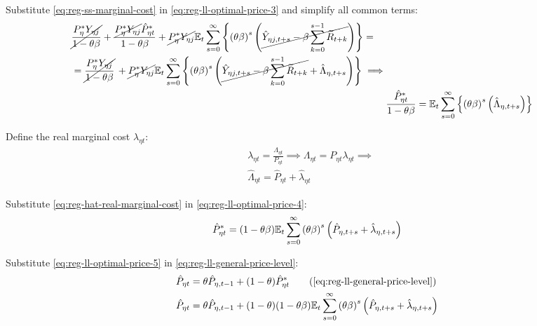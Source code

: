 \documentclass[../thesis.tex]{subfiles}
\begin{document}
Substitute \ref{eq:reg-ss-marginal-cost} in \ref{eq:reg-ll-optimal-price-3} and simplify all common terms:
\begin{align}
	\begin{split}
		& \cancel{\frac{P_{\eta}^{\ast} Y_{\eta j}}{1-\theta\beta}} + \frac{ \cancel{P_{\eta}^{\ast} Y_{\eta j}} \hat{P}_{\eta t}^{\ast}}{1- \theta \beta} + \cancel{P_{\eta}^{\ast} Y_{\eta j}} {\mathbb{E}_{t}} \sum_{s=0}^{\infty} \left\{ \left( \theta \beta \right)^s \left( \cancel{\hat{Y}_{\eta j, t+s} - \beta \sum_{k=0}^{s-1} \widetilde{R}_{t+k}} \right) \right\} = 
		\\
		& = \cancel{\frac{P_{\eta}^{\ast} Y_{\eta j}}{1-\theta\beta}} \, + \cancel{P_{\eta}^{\ast} Y_{\eta j}} {\mathbb{E}_{t}} \sum_{s=0}^{\infty} \left\{ \left( \theta \beta \right)^s \left( \cancel{\hat{Y}_{\eta j, t+s} - \beta \sum_{k=0}^{s-1} \widetilde{R}_{t+k}} + \hat{\Lambda}_{\eta, t+s} \right) \right\} \implies	
	\end{split} \nonumber \\
	& \frac{ \hat{P}_{\eta t}^{\ast}}{1- \theta \beta} = {\mathbb{E}_{t}} \sum_{s=0}^{\infty} \left\{ \left( \theta \beta \right)^s \left( \hat{\Lambda}_{\eta, t+s} \right) \right\} \label{eq:reg-ll-optimal-price-4}
\end{align}



Define the real marginal cost $\lambda_{\eta t}$:
\begin{align}
	& \lambda_{\eta t} = \frac{\Lambda_{\eta t}}{P_{\eta t}} \implies \Lambda_{\eta t} = P_{\eta t} \lambda_{\eta t} \implies \nonumber \\
	& \hat{\Lambda}_{\eta t} = \hat{P}_{\eta t} + \hat{\lambda}_{\eta t} \label{eq:reg-hat-real-marginal-cost}
\end{align}

Substitute \ref{eq:reg-hat-real-marginal-cost} in \ref{eq:reg-ll-optimal-price-4}:
\begin{align}
	\hat{P}_{\eta t}^{\ast} = (1- \theta \beta) {\mathbb{E}_{t}} \sum_{s=0}^{\infty} \left( \theta \beta \right)^s \left( \hat{P}_{\eta, t+s} + \hat{\lambda}_{\eta, t+s} \right) \label{eq:reg-ll-optimal-price-5}
\end{align}

Substitute \ref{eq:reg-ll-optimal-price-5} in \ref{eq:reg-ll-general-price-level}:
\begin{align}
	\hat{P}_{\eta t} &= \theta \hat{P}_{\eta, t-1} + (1-\theta) \hat{P}_{\eta t}^{\ast} \tag{\ref{eq:reg-ll-general-price-level}}\\
	\hat{P}_{\eta t} &= \theta \hat{P}_{\eta, t-1} + (1-\theta) (1- \theta \beta) \E \sum_{s=0}^{\infty} \left( \theta \beta \right)^s \left( \hat{P}_{\eta, t+s} + \hat{\lambda}_{\eta, t+s} \right) \label{eq:reg-ll-general-price-level-2}
\end{align}
\end{document}

